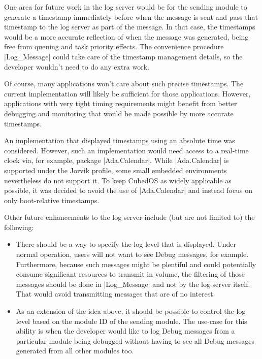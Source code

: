One area for future work in the log server would be for the sending module to generate a
timestamp immediately before when the message is sent and pass that timestamp to the log server
as part of the message. In that case, the timestamps would be a more accurate reflection of when
the message was generated, being free from queuing and task priority effects. The convenience
procedure |Log_Message| could take care of the timestamp management details, so the developer
wouldn't need to do any extra work.

Of course, many applications won't care about such precise timestamps. The current
implementation will likely be sufficient for those applications. However, applications with very
tight timing requirements might benefit from better debugging and monitoring that would be made
possible by more accurate timestamps.

An implementation that displayed timestamps using an absolute time was considered. However, such
an implementation would need access to a real-time clock via, for example, package
|Ada.Calendar|. While |Ada.Calendar| is supported under the Jorvik profile, some small embedded
environments nevertheless do not support it. To keep CubedOS as widely applicable as possible,
it was decided to avoid the use of |Ada.Calendar| and instead focus on only boot-relative
timestamps.

Other future enhancements to the log server include (but are not limited to) the following:
\begin{itemize}
\item There should be a way to specify the log level that is displayed. Under normal operation,
users will not want to see Debug messages, for example. Furthermore, because such messages might
be plentiful and could potentially consume significant resources to transmit in volume, the
filtering of those messages should be done in |Log_Message| and not by the log server itself.
That would avoid transmitting messages that are of no interest.

\item As an extension of the idea above, it should be possible to control the log level based on
the module ID of the sending module. The use-case for this ability is when the developer would
like to log Debug messages from a particular module being debugged without having to see all
Debug messages generated from all other modules too.
\end{itemize}